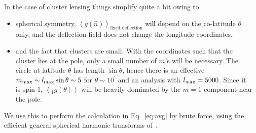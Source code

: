\documentclass[prd, superscriptaddress, tightenlines, longbibliography, nofootinbib, eqsecnum, amsfonts, amsmath, floatfix, twocolumn, notitlepage]{revtex4-2}
\newcommand{\av}[1]{\left \langle #1\right\rangle}
\begin{document}
In the case of cluster lensing things simplify quite a bit owing to
\begin{itemize}
	\item  spherical symmetry, $\av{g(\hat n)}_{\textrm{fixed deflection}}$ will depend on the co-latitude $\theta$ only, and the deflection field does not change the longitude coordinates,
	\item and the fact that clusters are small. With the coordinates such that the cluster lies at the pole, only a small number of $m$'s will be necessary. The circle at latitude $\theta$ has length $\sin \theta$, hence there is an effective $m_{\rm max} \sim l_{\rm max} \sin \theta \sim 5$ for $\theta \sim 10^{'}$ and an analysis with $l_{\rm max} = 5000$. 
	Since it is spin-1, $\av{_1g(\theta)}$ will be heavily dominated by the $m = 1$ component near the pole.
\end{itemize}
We use this to perform the calculation in Eq.~\eqref{eq:avg} by brute force, using the efficient general spherical harmonic transforms of~\cite{Reinecke:2023gtp}.
\end{document}
